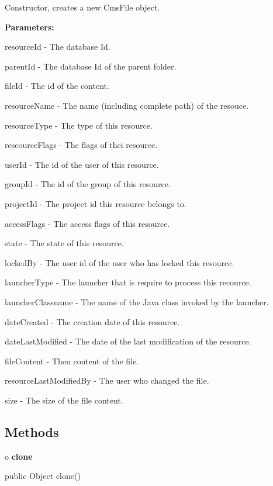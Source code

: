 \begin{description}
\htmlDD Constructor, creates a new CmsFile object. 

\begin{description}
\item {\bf Parameters:}  

resourceId - The database Id.  

parentId - The database Id of the parent folder.  

fileId - The id of the content.  

resourceName - The name (including complete path) of the resouce.  

resourceType - The type of this resource.  

rescourceFlags - The flags of thei resource.  

userId - The id of the user of this resource.  

groupId - The id of the group of this resource.  

projectId - The project id this resource belongs to.  

accessFlags - The access flags of this resource.  

state - The state of this resource.  

lockedBy - The user id of the user who has locked this resource.  

launcherType - The launcher that is require to process this recource.  

launcherClassname - The name of the Java class invoked by the launcher.  

dateCreated - The creation date of this resource.  

dateLastModified - The date of the last modification of the resource.  

fileContent - Then content of the file.  

resourceLastModifiedBy - The user who changed the file.  

size - The size of the file content.  
\end{description}

\end{description}

\subsection*{  Methods }

o {\bf clone} 

\begin{PRE}
 public Object clone()
\end{PRE}

